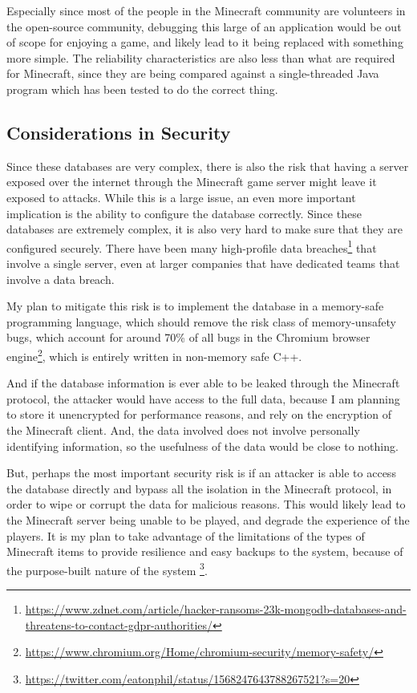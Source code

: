 \documentclass[10pt,twocolumn]{article}
\begin{document}
Especially since most of the people in the Minecraft community are volunteers in
the open-source community, debugging this large of an application would be out of
scope for enjoying a game, and likely lead to it being replaced with something
more simple. The reliability characteristics are also less than what are
required for Minecraft, since they are being compared against a single-threaded
Java program which has been tested to do the correct thing.

\subsection{Considerations in Security}

Since these databases are very complex, there is also the risk that having a
server exposed over the internet through the Minecraft game server might leave
it exposed to attacks. While this is a large issue, an even more important
implication is the ability to configure the database correctly. Since these
databases are extremely complex, it is also very hard to make sure that they are
configured securely. There have been many high-profile data
breaches\footnote{\url{https://www.zdnet.com/article/hacker-ransoms-23k-mongodb-databases-and-threatens-to-contact-gdpr-authorities/}}
that involve a single server, even at larger companies that have dedicated teams
that involve a data breach.

My plan to mitigate this risk is to implement the database in a memory-safe
programming language, which should remove the risk class of memory-unsafety
bugs, which account for around 70\% of all bugs in the Chromium browser
engine\footnote{\url{https://www.chromium.org/Home/chromium-security/memory-safety/}},
which is entirely written in non-memory safe C++.

And if the database information is ever able to be leaked through the Minecraft
protocol, the attacker would have access to the full data, because I am planning
to store it unencrypted for performance reasons, and rely on the encryption of
the Minecraft client. And, the data involved does not involve personally
identifying information, so the usefulness of the data would be close to
nothing.

But, perhaps the most important security risk is if an attacker is able to
access the database directly and bypass all the isolation in the Minecraft
protocol, in order to wipe or corrupt the data for malicious reasons. This would
likely lead to the Minecraft server being unable to be played, and degrade the
experience of the players. It is my plan to take advantage of the limitations of
the types of Minecraft items to provide resilience and easy backups to the
system, because of the purpose-built nature of the system
\footnote{\url{https://twitter.com/eatonphil/status/1568247643788267521?s=20}}.
\end{document}
